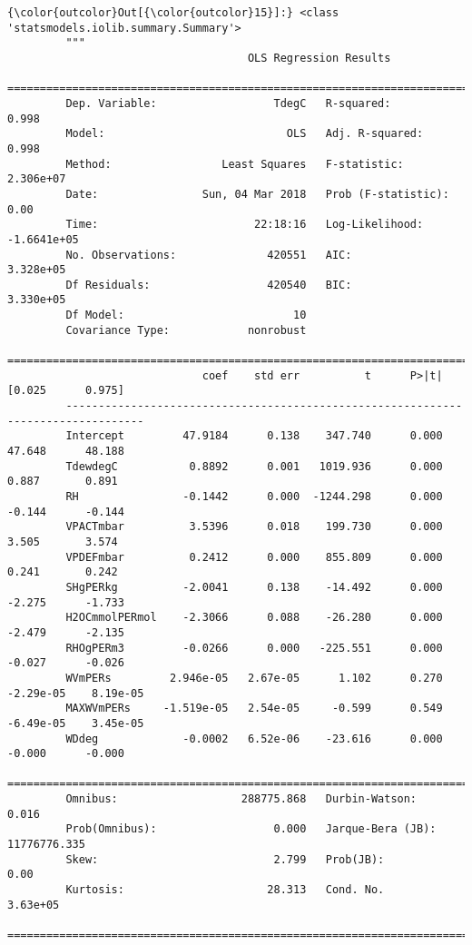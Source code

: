 \documentclass[11pt]{article}
\begin{document}
\begin{Verbatim}[commandchars=\\\{\}]
{\color{outcolor}Out[{\color{outcolor}15}]:} <class 'statsmodels.iolib.summary.Summary'>
         """
                                     OLS Regression Results                            
         ==============================================================================
         Dep. Variable:                  TdegC   R-squared:                       0.998
         Model:                            OLS   Adj. R-squared:                  0.998
         Method:                 Least Squares   F-statistic:                 2.306e+07
         Date:                Sun, 04 Mar 2018   Prob (F-statistic):               0.00
         Time:                        22:18:16   Log-Likelihood:            -1.6641e+05
         No. Observations:              420551   AIC:                         3.328e+05
         Df Residuals:                  420540   BIC:                         3.330e+05
         Df Model:                          10                                         
         Covariance Type:            nonrobust                                         
         ==================================================================================
                              coef    std err          t      P>|t|      [0.025      0.975]
         ----------------------------------------------------------------------------------
         Intercept         47.9184      0.138    347.740      0.000      47.648      48.188
         TdewdegC           0.8892      0.001   1019.936      0.000       0.887       0.891
         RH                -0.1442      0.000  -1244.298      0.000      -0.144      -0.144
         VPACTmbar          3.5396      0.018    199.730      0.000       3.505       3.574
         VPDEFmbar          0.2412      0.000    855.809      0.000       0.241       0.242
         SHgPERkg          -2.0041      0.138    -14.492      0.000      -2.275      -1.733
         H2OCmmolPERmol    -2.3066      0.088    -26.280      0.000      -2.479      -2.135
         RHOgPERm3         -0.0266      0.000   -225.551      0.000      -0.027      -0.026
         WVmPERs         2.946e-05   2.67e-05      1.102      0.270   -2.29e-05    8.19e-05
         MAXWVmPERs     -1.519e-05   2.54e-05     -0.599      0.549   -6.49e-05    3.45e-05
         WDdeg             -0.0002   6.52e-06    -23.616      0.000      -0.000      -0.000
         ==============================================================================
         Omnibus:                   288775.868   Durbin-Watson:                   0.016
         Prob(Omnibus):                  0.000   Jarque-Bera (JB):         11776776.335
         Skew:                           2.799   Prob(JB):                         0.00
         Kurtosis:                      28.313   Cond. No.                     3.63e+05
         ==============================================================================
         

\end{Verbatim}
\end{document}
